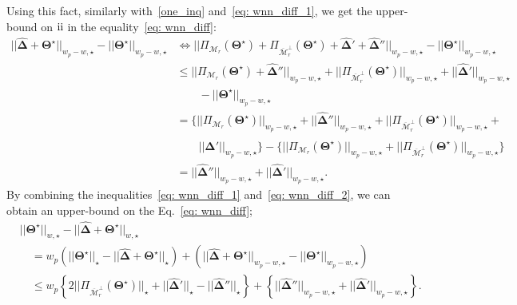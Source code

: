 \documentclass[12pt]{article}
\newcommand{\RN}[1]{%
  \textup{\uppercase\expandafter{\romannumeral#1}}%
}
\begin{document}
Using this fact, similarly with~\eqref{one_inq} and~\eqref{eq: wnn_diff_1}, we get the upper-bound on $\RN{2}$ in the equality~\eqref{eq: wnn_diff}: 
\begin{align}
||\boldsymbol{\widehat{\Delta}} + \boldsymbol{\Theta^{\star}}||_{w_{p} - w, \star} -  ||\boldsymbol{\Theta^{\star}}||_{w_{p} - w, \star} 
 & \Leftrightarrow  ||\Pi_{\mathcal{M}_{r}}(\boldsymbol{\Theta^{\star}}) + \Pi_{\overline{\mathcal{M}}_{r}^{\perp}}(\boldsymbol{\Theta^{\star}}) + \boldsymbol{\widehat{\Delta}}' + \boldsymbol{\widehat{\Delta}}''||_{w_{p} - w, \star} - ||\boldsymbol{\Theta^{\star}}||_{w_{p} - w, \star} \nonumber\\
 & \leq ||\Pi_{\mathcal{M}_{r}}(\boldsymbol{\Theta^{\star}}) + \boldsymbol{\widehat{\Delta}}''||_{w_{p} - w, \star} + || \Pi_{\overline{\mathcal{M}}_{r}^{\perp}}(\boldsymbol{\Theta^{\star}}) ||_{w_{p} - w, \star} + ||\boldsymbol{\widehat{\Delta}}'||_{w_{p} - w, \star} 
 \nonumber \\
 & \qquad - ||\boldsymbol{\Theta^{\star}}||_{w_{p} - w, \star} \nonumber\\
 & = \bigg\{ ||\Pi_{\mathcal{M}_{r}}(\boldsymbol{\Theta^{\star}})||_{w_{p} - w, \star} + || \boldsymbol{\widehat{\Delta}}''||_{w_{p} - w, \star}  + || \Pi_{\overline{\mathcal{M}}_{r}^{\perp}}(\boldsymbol{\Theta^{\star}}) ||_{w_{p} - w, \star} + \nonumber\\
 & \qquad ||\boldsymbol{\widehat{\Delta}}' ||_{w_{p} - w, \star} \bigg\}  - \bigg\{ ||\Pi_{\mathcal{M}_{r}}(\boldsymbol{\Theta^{\star}})||_{w_{p} - w, \star} + || \Pi_{\overline{\mathcal{M}}_{r}^{\perp}}(\boldsymbol{\Theta^{\star}}) ||_{w_{p} - w, \star} \bigg\} \nonumber\\
 & = ||\boldsymbol{\widehat{\Delta}}''||_{w_{p} - w, \star}  + ||\boldsymbol{\widehat{\Delta}}'||_{w_{p} - w, \star}. \label{eq: wnn_diff_2} 
\end{align}
By combining the inequalities~\eqref{eq: wnn_diff_1} and~\eqref{eq: wnn_diff_2}, we can obtain an upper-bound on the Eq.~\eqref{eq: wnn_diff};
\begin{align}
    &||\boldsymbol{\Theta^{\star}}||_{w,\star} - ||\boldsymbol{\widehat{\Delta}} + \boldsymbol{\Theta^{\star}}||_{w,\star} \nonumber \\
    &\quad =   w_{p}(||\boldsymbol{\Theta^{\star}}||_{\star} - ||\boldsymbol{\widehat{\Delta}} + \boldsymbol{\Theta^{\star}}||_{\star}) + (||\boldsymbol{\widehat{\Delta}} + \boldsymbol{\Theta^{\star}}||_{w_{p}-w,\star} - ||\boldsymbol{\Theta^{\star}}||_{w_{p}-w,\star} )  \nonumber\\ 
    &\quad \leq  w_{p}\left\lbrace 2||\Pi_{\overline{\mathcal{M}}_{r}^{\perp}}(\boldsymbol{\Theta^{\star}})||_{\star} + ||\boldsymbol{\widehat{\Delta}}'||_{\star} - ||\boldsymbol{\widehat{\Delta}}''||_{\star}  \right\rbrace + \left\lbrace ||\boldsymbol{\widehat{\Delta}}''||_{w_{p} - w, \star}  + ||\boldsymbol{\widehat{\Delta}}'||_{w_{p} - w, \star}\right\rbrace.\nonumber
\end{align}
\end{document}
